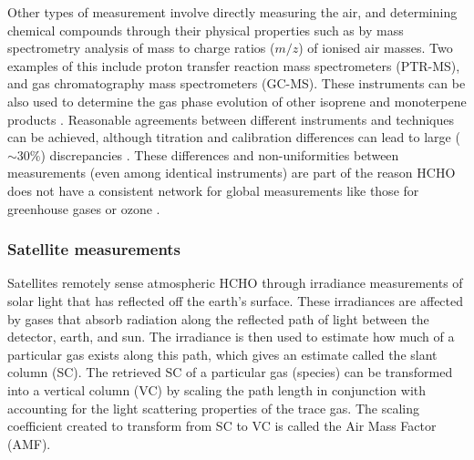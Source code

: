     
    Other types of measurement involve directly measuring the air, and determining chemical compounds through their physical properties such as by mass spectrometry analysis of mass to charge ratios ($m/z$) of ionised air masses.
    Two examples of this include proton transfer reaction mass spectrometers (PTR-MS), and gas chromatography mass spectrometers (GC-MS).
    These instruments can be also used to determine the gas phase evolution of 
    other isoprene and monoterpene products 
    \parencite[e.g.,][]{Lee2006a,Nguyen2014,Wolfe2016,Lerner2017}.
    Reasonable agreements between different instruments and techniques can be 
    achieved, although titration and calibration differences can lead to large 
    ($\sim 30\%$) discrepancies \parencite[e.g.,][]{Hak2005}.
    These differences and non-uniformities between measurements (even among identical instruments) are part of the reason HCHO does not have a consistent network for global measurements like those for greenhouse gases or ozone \parencite{FortemsCheiney2012}.
  
    \subsubsection{Satellite measurements}
      \label{LR:HCHO:Sat}
      
      Satellites remotely sense atmospheric HCHO through irradiance measurements of solar light that has reflected off the earth's surface. 
      These irradiances are affected by gases that absorb radiation along the reflected path of light between the detector, earth, and sun. 
      The irradiance is then used to estimate how much of a particular gas exists along this path, which gives an estimate called the slant column (SC).
      The retrieved SC of a particular gas (species) can be transformed into a vertical column (VC) by scaling the path length in conjunction with accounting for the light scattering properties of the trace gas.
      The scaling coefficient created to transform from SC to VC is called the Air Mass Factor (AMF).
      
